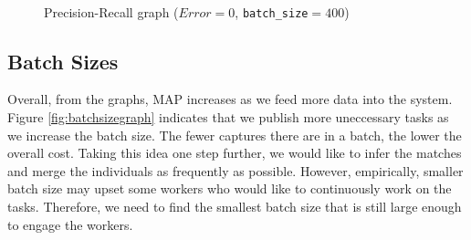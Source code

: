 \begin{figure}[h!]
  \label{pr-curves}
  \centering
  \\
  \captionsetup{justification=centering}
  \caption{Precision-Recall graph ($Error=0$, \texttt{batch\_size}$=400$)}
\end{figure}

\subsection{Batch Sizes} %
\label{sub:batch_sizes_res}

Overall, from the graphs, MAP increases as we feed more data into the system. Figure \ref{fig:batchsizegraph} indicates that we publish more uneccessary tasks as we increase the batch size. The fewer captures there are in a batch, the lower the overall cost. Taking this idea one step further, we would like to infer the matches and merge the individuals as frequently as possible. However, empirically, smaller batch size may upset some workers who would like to continuously work on the tasks. Therefore, we need to find the smallest batch size that is still large enough to engage the workers.

